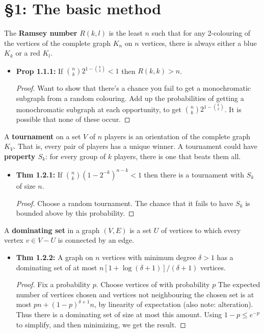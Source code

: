\documentclass[11pt]{article}
\newenvironment{INT}[1][]{\begin{itemize}\small\item\textbf{#1}}{\end{itemize}}
\begin{document}
\section*{\S1: The basic method}
\begin{itemise}
\item The \textbf{Ramsey number} $R(k,l)$ is the least $n$ such that for any 2-colouring of the vertices of the complete graph $K_n$ on $n$ vertices, there is always either a blue $K_k$ or a red $K_l$.
\begin{INT}[Prop 1.1.1:]
If ${n\choose k}2^{1-{k\choose 2}}<1$ then $R(k,k)>n$.
\begin{proof}
Want to show that there's a chance you fail to get a monochromatic subgraph from a random colouring. Add up the probabilities of getting a monochromatic subgraph at each opportunity, to get ${n\choose k}2^{1-{k\choose 2}}$. It is possible that none of these occur.
\end{proof}
\end{INT}
\item A \textbf{tournament} on a set $V$ of $n$ players is an orientation of the complete graph $K_V$. That is, every pair of players has a unique winner.
A tournament could have \textbf{property $S_k$}: for every group of $k$ players, there is one that beats them all.
\begin{INT}[Thm 1.2.1:]
If ${n\choose k}(1-2^{-k})^{n-k}<1$ then there is a tournament with $S_k$ of size $n$.
\begin{proof}
Choose a random tournament. The chance that it fails to have $S_k$ is bounded above by this probability.
\end{proof}
\end{INT}
\item A \textbf{dominating set} in a graph $(V,E)$ is a set $U$ of vertices to which every vertex $v\in V-U$ is connected by an edge.
\begin{INT}[Thm 1.2.2:]
A graph on $n$ vertices with minimum degree $\delta>1$ has a dominating set of at most $n[1+\log(\delta+1)]/(\delta+1)$ vertices.
\begin{proof}
Fix a probability $p$. Choose vertices of with probability $p$ The expected number of vertices chosen and vertices not neighbouring the chosen set is at most $pn+(1-p)^{\delta+1}n$, by linearity of expectation (also note: alteration). Thus there is a dominating set of size at most this amount. Using $1-p\leq e^{-p}$ to simplify, and then minimizing, we get the result.
\end{proof}
\end{INT}

\end{itemise}
\end{document}
